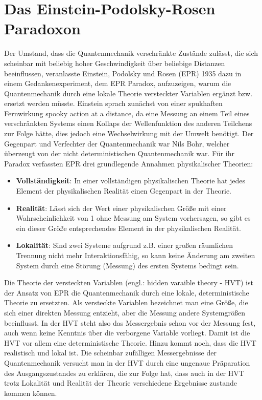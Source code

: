 \documentclass[twoside,colorback,accentcolor=tud4c,11pt]{tudreport}
\begin{document}
\section{Das Einstein-Podolsky-Rosen Paradoxon}
Der Umstand, dass die Quantenmechanik verschränkte Zustände zulässt, die sich scheinbar mit beliebig hoher Geschwindigkeit über beliebige Distanzen beeinflussen, veranlasste Einstein, Podolsky und Rosen (EPR) 1935 dazu in einem Gedankenexperiment, dem EPR Paradox, aufzuzeigen, warum die Quantenmechanik durch eine lokale Theorie versteckter Variablen ergänzt bzw. ersetzt werden müsste. Einstein sprach zunächst von einer spukhaften Fernwirkung \glqq spooky action at a distance\grqq , da eine Messung an einem Teil eines verschränkten Systems einen Kollaps der Wellenfunktion des anderen Teilchens zur Folge hätte, dies jedoch eine Wechselwirkung mit der Umwelt benötigt.
Der Gegenpart und Verfechter der Quantenmechanik war Nils Bohr, welcher überzeugt von der nicht deterministischen Quantenmechanik war.
Für ihr Paradox verfassten EPR drei grundlegende Annahmen physikalischer Theorien:
\begin{itemize}
\item\textbf{Vollständigkeit}: In einer vollständigen physikalischen Theorie hat jedes Element der physikalischen Realität einen Gegenpart in der Theorie.
\item\textbf{Realität}: Lässt sich der Wert einer physikalischen Größe mit einer Wahrscheinlichkeit von 1 ohne Messung am System vorhersagen, so gibt es ein dieser Größe entsprechendes Element in der physikalischen Realität.
\item\textbf{Lokalität}: Sind zwei Systeme aufgrund z.B. einer großen räumlichen Trennung nicht mehr Interaktionsfähig, so kann keine Änderung am zweiten System durch eine Störung (Messung) des ersten Systems bedingt sein.
\end{itemize}
Die Theorie der versteckten Variablen (engl.: hidden varaible theory - HVT) ist der Ansatz von EPR die Quantenmechanik durch eine lokale, deterministische Theorie zu ersetzten. Als versteckte Variablen bezeichnet man eine Größe, die sich einer direkten Messung entzieht, aber die Messung andere Systemgrößen beeinflusst. In der HVT steht also das Messergebnis schon vor der Messung fest, auch wenn keine Kenntnis über die verborgene Variable vorliegt. Damit ist die HVT vor allem eine deterministische Theorie. Hinzu kommt noch, dass die HVT realistisch und lokal ist. Die scheinbar zufälligen Messergebnisse der Quantenmechanik versucht man in der HVT durch eine ungenaue Präparation des Ausgangszustandes zu erklären, die zur Folge hat, dass auch in der HVT trotz Lokalität und Realität der Theorie verschiedene Ergebnisse zustande kommen können.
\end{document}
